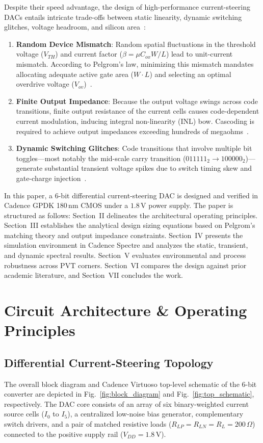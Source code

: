 \documentclass[conference,10pt]{IEEEtran}
\begin{document}
Despite their speed advantage, the design of high-performance current-steering DACs entails intricate trade-offs between static linearity, dynamic switching glitches, voltage headroom, and silicon area~\cite{pelgrom_mismatch, vandenbosch_10bit_1gsps}:
\begin{enumerate}
    \item \textbf{Random Device Mismatch}: Random spatial fluctuations in the threshold voltage ($V_{TH}$) and current factor ($\beta = \mu C_{ox} W/L$) lead to unit-current mismatch. According to Pelgrom's law, minimizing this mismatch mandates allocating adequate active gate area ($W \cdot L$) and selecting an optimal overdrive voltage ($V_{ov}$)~\cite{pelgrom_mismatch, albiol_mismatch_yield}.
    \item \textbf{Finite Output Impedance}: Because the output voltage swings across code transitions, finite output resistance of the current cells causes code-dependent current modulation, inducing integral non-linearity (INL) bow. Cascoding is required to achieve output impedances exceeding hundreds of megaohms~\cite{razavi_analog_cmos}.
    \item \textbf{Dynamic Switching Glitches}: Code transitions that involve multiple bit toggles—most notably the mid-scale carry transition ($011111_2 \to 100000_2$)—generate substantial transient voltage spikes due to switch timing skew and gate-charge injection~\cite{merritt_high_speed_dac}.
\end{enumerate}

In this paper, a 6-bit differential current-steering DAC is designed and verified in Cadence GPDK 180\,nm CMOS under a $1.8\,\text{V}$ power supply. The paper is structured as follows: Section~II delineates the architectural operating principles. Section~III establishes the analytical design sizing equations based on Pelgrom's matching theory and output impedance constraints. Section~IV presents the simulation environment in Cadence Spectre and analyzes the static, transient, and dynamic spectral results. Section~V evaluates environmental and process robustness across PVT corners. Section~VI compares the design against prior academic literature, and Section~VII concludes the work.

\section{Circuit Architecture \& Operating Principles}

\subsection{Differential Current-Steering Topology}
The overall block diagram and Cadence Virtuoso top-level schematic of the 6-bit converter are depicted in Fig.~\ref{fig:block_diagram} and Fig.~\ref{fig:top_schematic}, respectively. The DAC core consists of an array of six binary-weighted current source cells ($I_0$ to $I_5$), a centralized low-noise bias generator, complementary switch drivers, and a pair of matched resistive loads ($R_{LP} = R_{LN} = R_L = 200\,\Omega$) connected to the positive supply rail ($V_{DD} = 1.8\,\text{V}$).
\end{document}
